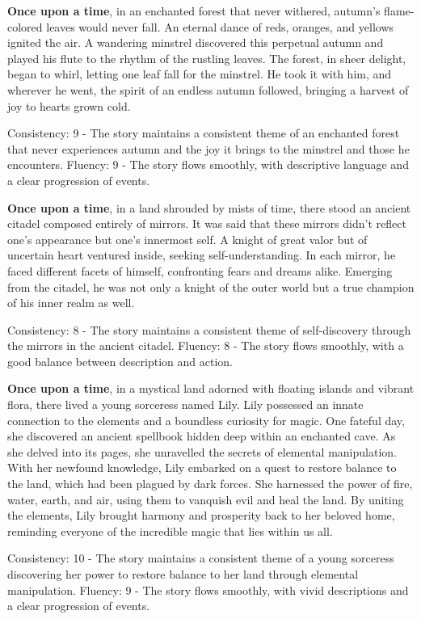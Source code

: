 \documentclass{article}
\begin{document}
\textbf{Once upon a time}, in an enchanted forest that never withered, autumn's flame-colored leaves would never fall. An eternal dance of reds, oranges, and yellows ignited the air. A wandering minstrel discovered this perpetual autumn and played his flute to the rhythm of the rustling leaves. The forest, in sheer delight, began to whirl, letting one leaf fall for the minstrel. He took it with him, and wherever he went, the spirit of an endless autumn followed, bringing a harvest of joy to hearts grown cold.

Consistency: 9 - The story maintains a consistent theme of an enchanted forest that never experiences autumn and the joy it brings to the minstrel and those he encounters.
Fluency: 9 - The story flows smoothly, with descriptive language and a clear progression of events.

\textbf{Once upon a time}, in a land shrouded by mists of time, there stood an ancient citadel composed entirely of mirrors. It was said that these mirrors didn't reflect one's appearance but one's innermost self. A knight of great valor but of uncertain heart ventured inside, seeking self-understanding. In each mirror, he faced different facets of himself, confronting fears and dreams alike. Emerging from the citadel, he was not only a knight of the outer world but a true champion of his inner realm as well.

Consistency: 8 - The story maintains a consistent theme of self-discovery through the mirrors in the ancient citadel.
Fluency: 8 - The story flows smoothly, with a good balance between description and action.

\textbf{Once upon a time}, in a mystical land adorned with floating islands and vibrant flora, there lived a young sorceress named Lily. Lily possessed an innate connection to the elements and a boundless curiosity for magic. One fateful day, she discovered an ancient spellbook hidden deep within an enchanted cave. As she delved into its pages, she unravelled the secrets of elemental manipulation. With her newfound knowledge, Lily embarked on a quest to restore balance to the land, which had been plagued by dark forces. She harnessed the power of fire, water, earth, and air, using them to vanquish evil and heal the land. By uniting the elements, Lily brought harmony and prosperity back to her beloved home, reminding everyone of the incredible magic that lies within us all.

Consistency: 10 - The story maintains a consistent theme of a young sorceress discovering her power to restore balance to her land through elemental manipulation.
Fluency: 9 - The story flows smoothly, with vivid descriptions and a clear progression of events.
\end{document}
